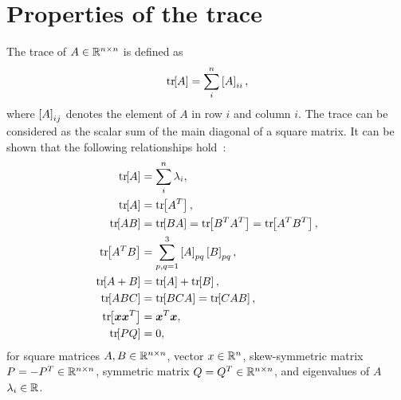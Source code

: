 
\chapter{Properties of the trace}\label{chap:trace}

The trace of \( A \in \mathbb{R}^{n \times n} \) is defined as
\begin{align}
    \mathrm{tr}\negthickspace\left[ A \right] = \sum_i^n \left[ A \right]_{ii},
\end{align}
where \( \left[ A \right]_{ij} \) denotes the element of \( A \) in row \( i \) and column \( i \).
The trace can be considered as the scalar sum of the main diagonal of a square matrix.
It can be shown that the following relationships hold~\cite{petersen2008,strang2008}:
\begin{align}
    \tr{A} &= \sum_i^n \lambda_i, \label{eq:treig}\\
    \tr{A} &= \tr{A^T}, \label{eq:trAT} \\
    \tr{A B} &= \tr{B A} = \tr{B^T A^T} = \tr{A^T B^T}, \label{eq:trAB} \\
    \tr{A^T B } &= \sum_{p, q=1}^3 \bracket{A}_{pq} \bracket{B}_{pq}, \label{eq:trATB} \\
    \tr{A+B} &= \tr{A} + \tr{B}, \label{eq:trApB} \\
    \tr{ABC} &= \tr{BCA} = \tr{CAB}, \label{eq:trABC}\\
    \tr{\vc{x}\vc{x}^T} &= \vc{x}^T \vc{x}, \label{eq:trxxT} \\
    \tr{PQ} &= 0, \label{eq:trPQ}
\end{align}
for square matrices \( A, B \in \mathbb{R}^{n \times n} \), vector \( x \in \mathbb{R}^n\), skew-symmetric matrix \( P = -P^T \in \mathbb{R}^{n\times n} \), symmetric matrix \( Q = Q^T \in \mathbb{R}^{n \times n} \), and eigenvalues of \( A \) \( \lambda_i \in \mathbb{R} \).
